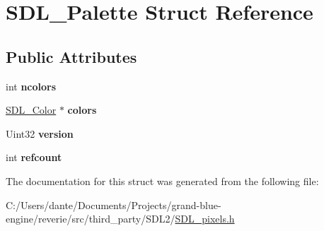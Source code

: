 \hypertarget{struct_s_d_l___palette}{}\section{S\+D\+L\+\_\+\+Palette Struct Reference}
\label{struct_s_d_l___palette}
\subsection*{Public Attributes}
\begin{DoxyCompactItemize}
\item 
\mbox{\label{struct_s_d_l___palette_a81a0cc3197480e994c6b06f1f0567091}} 
int {\bfseries ncolors}
\item 
\mbox{\label{struct_s_d_l___palette_ad757a50037f43533196e94942440b241}} 
\mbox{\hyperlink{struct_s_d_l___color}{S\+D\+L\+\_\+\+Color}} $\ast$ {\bfseries colors}
\item 
\mbox{\label{struct_s_d_l___palette_a5b8d45519f6850a32f13f1602ce37a8e}} 
Uint32 {\bfseries version}
\item 
\mbox{\label{struct_s_d_l___palette_a35c667737f883f973bb0a8dea143b08d}} 
int {\bfseries refcount}
\end{DoxyCompactItemize}


The documentation for this struct was generated from the following file\+:\begin{DoxyCompactItemize}
\item 
C\+:/\+Users/dante/\+Documents/\+Projects/grand-\/blue-\/engine/reverie/src/third\+\_\+party/\+S\+D\+L2/\mbox{\hyperlink{_s_d_l__pixels_8h}{S\+D\+L\+\_\+pixels.\+h}}\end{DoxyCompactItemize}
